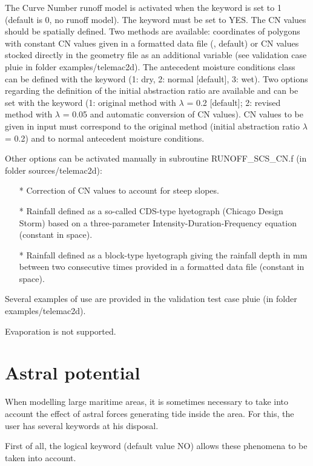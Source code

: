 The Curve Number runoff model is activated when the keyword  is set to 1 (default is 0, no runoff model). The keyword  
must be set to YES. The CN values should be spatially defined. Two methods are available: coordinates of polygons with constant CN values given in a formatted data file (, default) or CN values stocked directly in the geometry file as an additional variable (see validation case pluie in folder examples/telemac2d). The antecedent moisture conditions class can be defined with the keyword  (1: dry, 2: normal [default], 3: wet). Two options regarding the definition of the initial abstraction ratio are available and can be set with the keyword  (1: original method with $\lambda$ = 0.2 [default]; 2: revised method with $\lambda$ = 0.05 and automatic conversion of CN values). CN values to be given in input must correspond to the original method (initial abstraction ratio $\lambda$ = 0.2) and to normal antecedent moisture conditions.

Other options can be activated manually in subroutine RUNOFF\_SCS\_CN.f (in folder sources/telemac2d):
\begin{itemize}
\item[*] Correction of CN values to account for steep slopes.
\item[*] Rainfall defined as a so-called CDS-type hyetograph (Chicago Design Storm) based on a three-parameter Intensity-Duration-Frequency equation (constant in space).
\item[*] Rainfall defined as a block-type hyetograph giving the rainfall depth in mm between two consecutive times provided in a formatted data file (constant in space).
\end{itemize}
Several examples of use are provided in the validation test case pluie (in folder examples/telemac2d).

Evaporation is not supported.


\section{Astral potential}
\label{sec:astral:pot}
 When modelling large maritime areas, it is sometimes necessary to take into account the effect of astral forces generating tide inside the area. For this, the user has several keywords at his disposal.

 First of all, the logical keyword  (default value NO) allows these phenomena to be taken into account.

